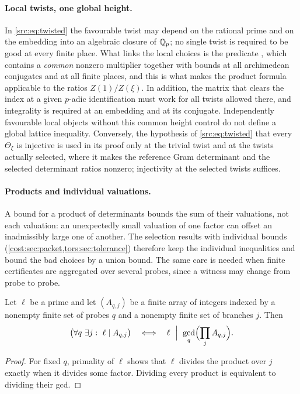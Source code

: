\paragraph{Local twists, one global height.}
In \eqref{src:eq:twisted} the favourable twist may depend on the rational prime and on the
embedding into an algebraic closure of $\mathbb{Q}_p$; no single twist is required to be good at every
finite place. What links the local choices is the predicate , which contains a
\emph{common} nonzero multiplier together with bounds at all archimedean conjugates and at
all finite places, and this is what makes the product formula applicable to the ratios
$Z(1)/Z(\xi)$. In addition, the matrix that clears the index at a given $p$-adic
identification must work for all twists allowed there, and integrality is required at an
embedding and at its conjugate. Independently favourable local objects without this common
height control do not define a global lattice inequality. Conversely, the hypothesis of
\eqref{src:eq:twisted} that every $\Theta_\xi$ is injective is used in its proof only at the
trivial twist and at the twists actually selected, where it makes the reference Gram
determinant and the selected determinant ratios nonzero; injectivity at the selected twists
suffices.

\paragraph{Products and individual valuations.}
A bound for a product of determinants bounds the sum of their valuations, not each valuation:
an unexpectedly small valuation of one factor can offset an inadmissibly large one of another.
The selection results with individual bounds (\cref{cost:sec:packet,tors:sec:tolerance})
therefore keep the individual inequalities and bound the bad choices by a union bound. The same care is needed when finite certificates are
aggregated over several probes, since a witness may change from probe to probe.

\begin{lemma}\label{src:lem:gcd}
Let $\ell$ be a prime and let $(A_{q,j})$ be a finite array of integers indexed by a nonempty
finite set of probes $q$ and a nonempty finite set of branches $j$. Then
\[
\bigl(\forall q\ \exists j:\ \ell\mid A_{q,j}\bigr)
\quad\Longleftrightarrow\quad
\ell\ \Bigm|\ \gcd_q\Bigl(\prod_jA_{q,j}\Bigr) .
\]
\end{lemma}

\begin{proof}
For fixed $q$, primality of $\ell$ shows that $\ell$ divides the product over $j$ exactly when
it divides some factor. Dividing every product is equivalent to dividing their gcd.
\end{proof}

